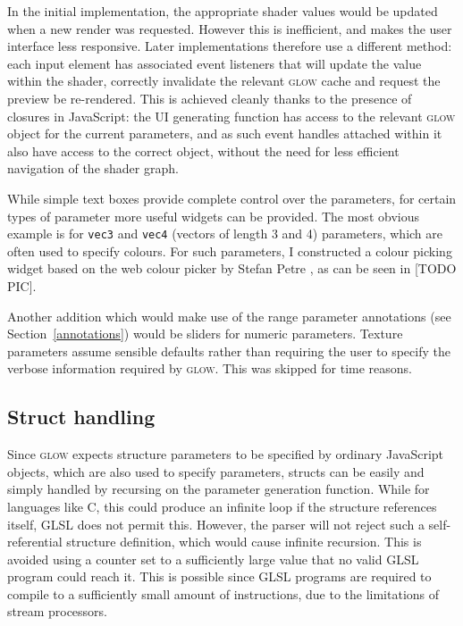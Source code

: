 \documentclass[12pt,twoside,notitlepage]{report}
\begin{document}
In the initial implementation, the appropriate shader values would be updated when a new render was requested. However this is inefficient, and makes the user interface less responsive. Later implementations therefore use a different method: each input element has associated event listeners that will update the value within the shader, correctly invalidate the relevant \textsc{glow} cache and request the preview be re-rendered. This is achieved cleanly thanks to the presence of closures in JavaScript: the UI generating function has access to the relevant \textsc{glow} object for the current parameters, and as such event handles attached within it also have access to the correct object, without the need for less efficient navigation of the shader graph. 

While simple text boxes provide complete control over the parameters, for certain types of parameter more useful widgets can be provided. The most obvious example is for \texttt{vec3} and \texttt{vec4} (vectors of length 3 and 4) parameters, which are often used to specify colours. For such parameters, I constructed a colour picking widget based on the web colour picker by Stefan Petre \citet{color}, as can be seen in [TODO PIC]. 

Another addition which would make use of the range parameter annotations (see Section~\ref{annotations}) would be sliders for numeric parameters. Texture parameters assume sensible defaults rather than requiring the user to specify the verbose information required by \textsc{glow}. This was skipped for time reasons.

\subsection*{Struct handling}
Since \textsc{glow} expects structure parameters to be specified by ordinary JavaScript objects, which are also used to specify parameters, structs can be easily and simply handled by recursing on the parameter generation function. While for languages like C, this could produce an infinite loop if the structure references itself, GLSL does not permit this. However, the parser will not reject such a self-referential structure definition, which would cause infinite recursion. This is avoided using a counter set to a sufficiently large value that no valid GLSL program could reach it. This is possible since GLSL programs are required to compile to a sufficiently small amount of instructions, due to the limitations of stream processors.
\end{document}
